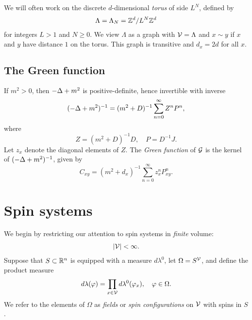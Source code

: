 \begin{example}
We will often work on the discrete $d$-dimensional \emph{torus}
of side $L^N$, defined by
\begin{equation}
\label{e:Lambda-torus}
\Lambda = \Lambda_N = { {{\mathbb Z}}^d }/L^N{ {{\mathbb Z}}^d }
\end{equation}
for integers $L > 1$ and $N \ge 0$.
We view $\Lambda$ as a graph with $\mathcal{V} = \Lambda$ and $x \sim y$ if
$x$ and $y$ have distance $1$ on the torus. This graph is transitive
and $d_x = 2d$ for all $x$.
\end{example}


\subsection{The Green function}

If $m^2 > 0$, then $-\Delta + m^2$ is positive-definite, hence invertible with inverse
\begin{equation}
(-\Delta + m^2)^{-1} = (m^2 + D)^{-1} \sum_{n=0}^\infty Z^n P^n,
\end{equation}
where
\begin{equation}
Z = (m^2 + D)^{-1} D,
  \quad
P = D^{-1} J.
\end{equation}
Let $z_x$ denote the diagonal elements of $Z$. The \emph{Green function}
of $\mathcal{G}$ is the kernel of $(-\Delta + m^2)^{-1}$, given by
\begin{equation}
\label{e:greendef}
C_{xy}
  =
(m^2 + d_x)^{-1} \sum_{n=0}^\infty z_x^n P^n_{xy}.
\end{equation}


\section{Spin systems}
\label{sec:spins}

We begin by restricting our attention to spin systems in \emph{finite} volume:
\begin{equation}
|\mathcal{V}| < \infty.
\end{equation}
Suppose that $S \subset {\mathbb R}^n$ is equipped with a measure $d\lambda^0$, let
$\Omega = S^{\mathcal{V}}$, and define the product measure
\begin{equation}
d\lambda(\varphi) = \prod_{x\in\mathcal{V}} d\lambda^0(\varphi_x),
	\quad
\varphi\in\Omega.
\end{equation}
We refer to the elements of $\Omega$ as \emph{fields}
or \emph{spin configurations} on $\mathcal{V}$ with spins in $S$.


